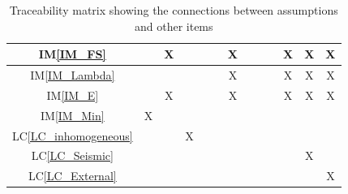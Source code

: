\documentclass[12pt]{article}
\newcommand{\iref}[1]{IM\ref{#1}}
\newcommand{\lcref}[1]{LC\ref{#1}}
\begin{document}
\begin{table}[h!]
\begin{tabular}{|c|c|c|c|c|c|c|c|c|c|c|c|c|}
\iref{IM_FS}            & & X& & & & X& & & & X& X& X\\ \hline
\iref{IM_Lambda}        & & & & & & X& & & & X& X& X\\ \hline
\iref{IM_E}             & & X& & & & X& & & & X& X& X\\ \hline
\iref{IM_Min}           & X& & & & & & & & & & & \\ \hline
\lcref{LC_inhomogeneous}& & & X& & & & & & & & & \\ \hline
\lcref{LC_Seismic}      & & & & & & & & & & & X& \\ \hline
\lcref{LC_External}     & & & & & & & & & & & & X\\
\hline
\end{tabular}
\caption{Traceability matrix showing the connections between assumptions 
and other items}
\label{Table:A_trace}
\end{table}
\end{document}
